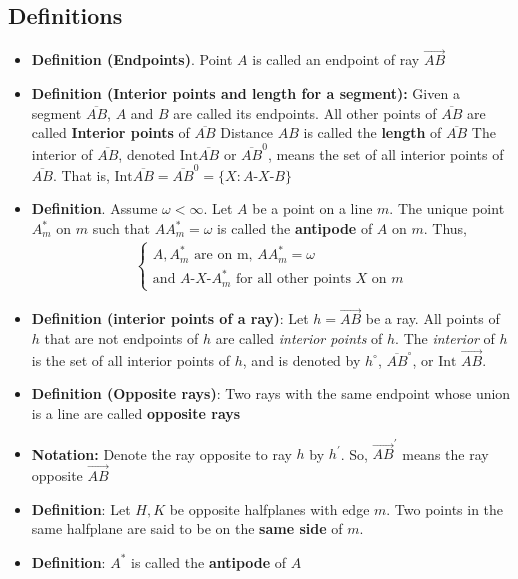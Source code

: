 \documentclass{report}
\begin{document}
    \subsection{Definitions}
    \begin{itemize}
        \item \textbf{Definition (Endpoints)}. Point $A$ is called an endpoint of ray $\overrightarrow{AB} $
        \item \textbf{Definition (Interior points and length for a segment):} Given a segment $ \overline{AB}$, $A$ and $B$ are called its endpoints. All other points of $\overline{AB}$ are called \textbf{Interior points} of $\overline{AB}$
            \bigbreak \noindent 
            Distance $AB$ is called the \textbf{length} of $\overline{AB} $
            \bigbreak \noindent 
            The interior of $\overline{AB}$, denoted $\text{Int}\overline{AB}$ or $\overline{AB}^{0}$, means the set of all interior points of $\overline{AB}$. That is, $\text{Int}\overline{AB} = \overline{AB}^{0} = \{X: A\text{-}X\text{-}B\}$
        \item \textbf{Definition}. Assume $\omega < \infty$. Let $A$ be a point on a line $m$. The unique point $A_{m}^{*}$ on $m$ such that $AA_{m}^{*} = \omega$ is called the \textbf{antipode} of $A$ on $m$. Thus,
            \begin{align*}
                \begin{cases}
                    A,A_{m}^{*} \text{ are on m, }  AA_{m}^{*} = \omega \\
                    \text{and } A\text{-}X\text{-}A_{m}^{*} \text{ for all other points $X$ on $m$}
                \end{cases}
            \end{align*}
        \item \textbf{Definition (interior points of a ray)}: Let \( h = \overrightarrow{AB} \) be a ray.  
            All points of \( h \) that are not endpoints of \( h \) are called \textit{interior points} of \( h \).  
            \bigbreak \noindent 
            The \textit{interior} of \( h \) is the set of all interior points of \( h \),  
            and is denoted by \( h^\circ \), \( \overline{AB}^\circ \), or \( \text{Int } \overrightarrow{AB} \).
        \item \textbf{Definition (Opposite rays)}: Two rays with the same endpoint whose union is a line are called \textbf{opposite rays}
        \item \textbf{Notation:} Denote the ray opposite to ray $h$ by $h^{\prime}$. So, $\overrightarrow{AB}^{\prime}$ means the ray opposite $\overrightarrow{AB} $
        \item \textbf{Definition}: Let $H,K$ be opposite halfplanes with edge $m$. Two points in the same halfplane are said to be on the \textbf{same side} of $m$. 
        \item \textbf{Definition}: $A^{*} $ is called the \textbf{antipode} of $A$

    \end{itemize}
\end{document}
